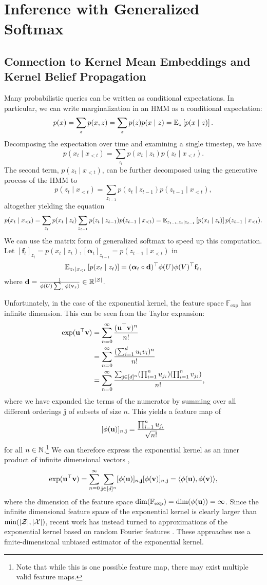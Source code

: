 \documentclass{article}
\begin{document}
\section{Inference with Generalized Softmax}
\subsection{Connection to Kernel Mean Embeddings and Kernel Belief Propagation}
Many probabilistic queries can be written as conditional expectations.
In particular, we can write marginalization in an HMM as a conditional expectation:
$$p(x) = \sum_z p(x,z) = \sum_z p(z)p(x \mid z) = \mathbb{E}_{z}\left[p(x \mid z)\right].$$
Decomposing the expectation over time and examining a single timestep, we have
$$p(x_t \mid x_{<t})
= \sum_{z_t}p(x_t\mid z_t)p(z_t \mid x_{<t}).
$$
The second term, $p(z_t \mid x_{<t})$,
can be further decomposed using the generative process of the HMM to
$$
 p(z_t \mid x_{<t}) = \sum_{z_{t-1}}p(z_t \mid z_{t-1})p(z_{t-1} \mid x_{<t}),
$$
altogether yielding the equation
$$
p(x_t \mid x_{<t})
= \sum_{z_t} p(x_t \mid z_t)\sum_{z_{t-1}}p(z_t \mid z_{t-1})p(z_{t-1} \mid x_{<t})
= \mathbb{E}_{z_{t-1},z_t\mid z_{t-1}}\left[p(x_t \mid z_t)\right]p(z_{t-1}\mid x_{<t}).
$$
We can use the matrix form of generalized softmax to speed up this computation.
Let $[\mathbf{f}_t]_{z_t} = p(x_t\mid z_t), [\bm\alpha_t]_{z_{t-1}} = p(z_{t-1}\mid x_{<t})$ in
$$\mathbb{E}_{z_t\mid x_{<t}}\left[p(x_t\mid z_t)\right]=(\bm\alpha_t\circ \mathbf{d})^\top\phi(U)\phi(V)^\top\mathbf{f}_t,$$
where $\mathbf{d} = \frac{1}{\phi(U)\sum_z\phi(\mathbf{v}_z)}\in\mathbb{R}^{|\mathcal{Z}|}$.

Unfortunately, in the case of the exponential kernel, the feature space $\mathbb{F}_{\exp}$
has infinite dimension.
This can be seen from the Taylor expansion:
\begin{align*}
\exp(\mathbf{u}^\top \mathbf{v})
&= \sum_{n=0}^\infty \frac{(\mathbf{u}^\top \mathbf{v})^n}{n!}\\
&= \sum_{n=0}^\infty \frac{(\sum_{i=1}^du_iv_i)^n}{n!}\\
&= \sum_{n=0}^\infty \frac{\sum_{\mathbf{j} \in [d]^n}(\prod_{i=1}^n u_{j_i})(\prod_{i=1}^n v_{j_i})}{n!},
\end{align*}
where we have expanded the terms of the numerator by summing over all different orderings
$\mathbf{j}$ of subsets of size $n$.
This yields a feature map of 
$$[\phi(\mathbf{u})]_{n,\mathbf{j}} = \frac{\prod_{i=1}^n u_{j_i}}{\sqrt{n!}}$$
for all $n\in\mathbb{N}$.\footnote{
Note that while this is one possible feature map, there may exist
multiple valid feature maps.
}
We can therefore express the exponential kernel as an inner product of
infinite dimensional vectors \citep{cotter2011gausskernel},
$$\exp(\mathbf{u}^\top\mathbf{v}) 
= \sum_{n=0}^\infty\sum_{\mathbf{j}\in[d]^n}[\phi(\mathbf{u})]_{n,\mathbf{j}}[\phi(\mathbf{v})]_{n,\mathbf{j}}
= \langle \phi(\mathbf{u}), \phi(\mathbf{v}) \rangle,
$$
where the dimension of the feature space $\dim(\mathbb{F}_{\exp}) = \dim(\phi(\mathbf{u})) = \infty$.
Since the infinite dimensional feature space of the exponential kernel is clearly larger than
$\min(|\mathcal{Z}|,|\mathcal{X}|)$, recent work has instead turned to approximations of the exponential kernel
based on random Fourier features
\citep{rawat2019sampledsoftmax,choromanski2020performer,peng2021rfa}.
These approaches use a finite-dimensional unbiased estimator of the exponential kernel.
\end{document}
